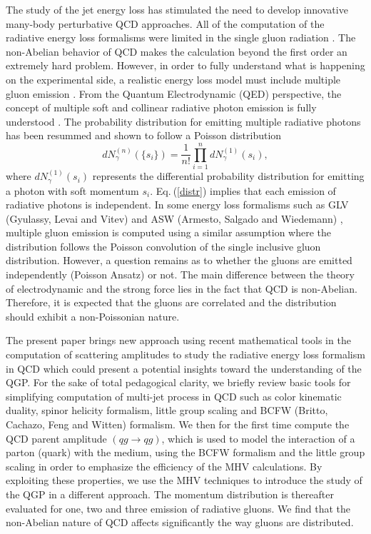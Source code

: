 \documentclass[twocolumn,secnumarabic,amssymb, nobibnotes, aps, prd,10pt]{revtex4-1}
\newcommand{\Eq}[1]{Eq.$\:$(\ref{#1})}
\begin{document}
The study of the jet energy loss has stimulated the need to develop innovative many-body perturbative QCD approaches. All of the computation of the radiative energy loss formalisms were limited in the single gluon radiation \cite{Gyulassy:1999zd,Armesto:2003jh}. The non-Abelian behavior of QCD makes the calculation beyond the first order an extremely hard problem. However, in order to fully understand what is happening on the experimental side, a realistic energy loss model must include multiple gluon emission \cite{Armesto:2011ht}. From the Quantum Electrodynamic (QED) perspective, the concept of multiple soft and collinear radiative photon emission is fully understood \cite{Peskin:1995ev}. The probability distribution for emitting multiple radiative photons has been resummed and shown to follow a Poisson distribution
\begin{equation}
	dN^{(n)}_\gamma (\{s_i\}) =\frac{1}{n!} \prod_{i=1}^{n} dN^{(1)}_\gamma(s_i),
	\label{distr}
\end{equation}
where $dN^{(1)}_\gamma(s_i)$ represents the differential probability distribution for emitting a photon with soft momentum $s_i$. \Eq{distr} implies that each emission of radiative photons is independent. In some energy loss formalisms such as GLV (Gyulassy, Levai and Vitev) \cite{Armesto:2015ioy, Gyulassy:2000fs, Gyulassy:2002yv} and ASW (Armesto, Salgado and Wiedemann) \cite{Armesto:2015ioy}, multiple gluon emission is computed using a similar assumption where the distribution follows the Poisson convolution of the single inclusive gluon distribution. However, a question remains as to whether the gluons are emitted independently (Poisson Ansatz) or not. The main difference between the theory of electrodynamic and the strong force lies in the fact that QCD is non-Abelian. Therefore, it is expected that the gluons are correlated and the distribution should exhibit a non-Poissonian nature.

The present paper brings new approach using recent mathematical tools in the computation of scattering amplitudes to study the radiative energy loss formalism in QCD which could present a potential insights toward the understanding of the QGP. For the sake of total pedagogical clarity, we briefly review basic tools for simplifying computation of multi-jet process in QCD such as color kinematic duality, spinor helicity formalism, little group scaling and BCFW (Britto, Cachazo, Feng and Witten) formalism. We then for the first time compute the QCD parent amplitude $(qg\rightarrow qg)$, which is used to model the interaction of a parton (quark) with the  medium, using the BCFW formalism and the little group scaling in order to emphasize the efficiency of the MHV calculations. By exploiting these properties, we use the MHV techniques to introduce the study of the QGP in a different approach. The momentum distribution is thereafter evaluated for one, two and three emission of radiative gluons. We find that the non-Abelian nature of QCD affects significantly the way gluons are distributed.
\end{document}
